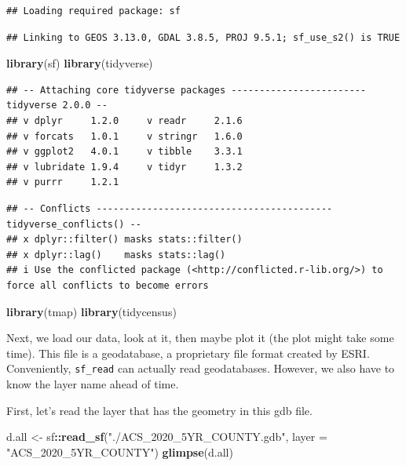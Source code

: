 \documentclass[
]{article}
\newenvironment{Shaded}{\begin{snugshade}}{\end{snugshade}}
\newcommand{\AttributeTok}[1]{\textcolor[rgb]{0.13,0.29,0.53}{#1}}
\newcommand{\FunctionTok}[1]{\textcolor[rgb]{0.13,0.29,0.53}{\textbf{#1}}}
\newcommand{\NormalTok}[1]{#1}
\newcommand{\OtherTok}[1]{\textcolor[rgb]{0.56,0.35,0.01}{#1}}
\newcommand{\SpecialCharTok}[1]{\textcolor[rgb]{0.81,0.36,0.00}{\textbf{#1}}}
\newcommand{\StringTok}[1]{\textcolor[rgb]{0.31,0.60,0.02}{#1}}
\begin{document}
\begin{verbatim}
## Loading required package: sf
\end{verbatim}

\begin{verbatim}
## Linking to GEOS 3.13.0, GDAL 3.8.5, PROJ 9.5.1; sf_use_s2() is TRUE
\end{verbatim}

\begin{Shaded}
\begin{Highlighting}[]
\FunctionTok{library}\NormalTok{(sf)}
\FunctionTok{library}\NormalTok{(tidyverse)}
\end{Highlighting}
\end{Shaded}

\begin{verbatim}
## -- Attaching core tidyverse packages ------------------------ tidyverse 2.0.0 --
## v dplyr     1.2.0     v readr     2.1.6
## v forcats   1.0.1     v stringr   1.6.0
## v ggplot2   4.0.1     v tibble    3.3.1
## v lubridate 1.9.4     v tidyr     1.3.2
## v purrr     1.2.1
\end{verbatim}

\begin{verbatim}
## -- Conflicts ------------------------------------------ tidyverse_conflicts() --
## x dplyr::filter() masks stats::filter()
## x dplyr::lag()    masks stats::lag()
## i Use the conflicted package (<http://conflicted.r-lib.org/>) to force all conflicts to become errors
\end{verbatim}

\begin{Shaded}
\begin{Highlighting}[]
\FunctionTok{library}\NormalTok{(tmap)}
\FunctionTok{library}\NormalTok{(tidycensus)}
\end{Highlighting}
\end{Shaded}

Next, we load our data, look at it, then maybe plot it (the plot might
take some time). This file is a geodatabase, a proprietary file format
created by ESRI. Conveniently, \texttt{sf\_read} can actually read
geodatabases. However, we also have to know the layer name ahead of
time.

First, let's read the layer that has the geometry in this gdb file.

\begin{Shaded}
\begin{Highlighting}[]
\NormalTok{d.all }\OtherTok{\textless{}{-}}\NormalTok{ sf}\SpecialCharTok{::}\FunctionTok{read\_sf}\NormalTok{(}\StringTok{"./ACS\_2020\_5YR\_COUNTY.gdb"}\NormalTok{, }\AttributeTok{layer =} \StringTok{"ACS\_2020\_5YR\_COUNTY"}\NormalTok{)}
\FunctionTok{glimpse}\NormalTok{(d.all)}
\end{Highlighting}
\end{Shaded}
\end{document}
